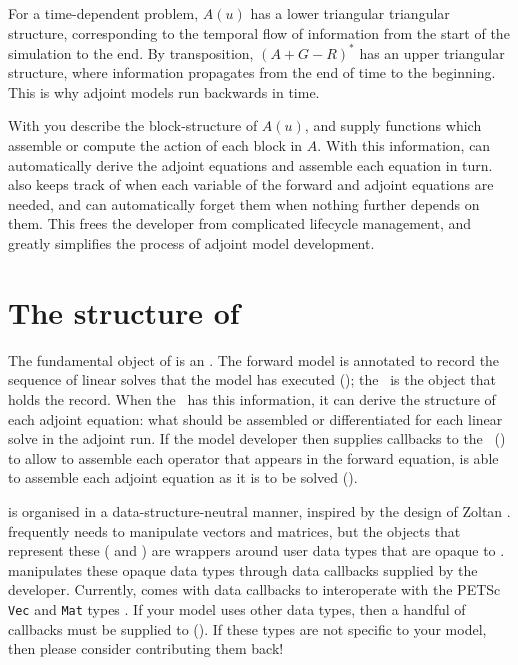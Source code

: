 For a time-dependent problem, $A(u)$ has a lower triangular triangular structure,
corresponding to the temporal flow of information from the start of the simulation
to the end. By transposition, $(A + G - R)^*$ has an upper triangular structure, where
information propagates from the end of time to the beginning. This is why adjoint
models run backwards in time.

With \libadjoint you describe the block-structure of $A(u)$,
and supply functions which assemble or compute the action of each block in $A$.
With this information, \libadjoint can automatically derive the adjoint equations
and assemble each equation in turn. \libadjoint also keeps track of when each
variable of the forward and adjoint equations are needed, and can automatically
forget them when nothing further depends on them. This frees the developer from
complicated lifecycle management, and greatly simplifies the process of adjoint model
development.

\section{The structure of \libadjoint}
The fundamental object of \libadjoint is an \adjointer. The forward model is annotated
to record the sequence of linear solves that the model has executed (); the \adjointer\ is
the object that holds the record. When the \adjointer\ has this information, it can derive
the structure of each adjoint equation: what should be assembled or differentiated for each linear
solve in the adjoint run. If the model developer then
supplies callbacks to the \adjointer\ () to allow \libadjoint to assemble each
operator that appears in the forward equation, \libadjoint is
able to assemble each adjoint equation as it is to be solved ().

\libadjoint is organised in a data-structure-neutral manner, inspired by the design
of Zoltan \citep{devine2002}. \libadjoint frequently needs to manipulate vectors
and matrices, but the objects that represent these ( and )
are wrappers around user data types that are opaque to \libadjoint. \libadjoint manipulates
these opaque data types through data callbacks supplied by the developer. Currently, \libadjoint
{}
comes with data callbacks to interoperate with the PETSc \texttt{Vec} and \texttt{Mat} types \citep{balay2010}.
If your model uses other data types, then a handful of callbacks must be supplied to \libadjoint ().
If these types are not specific to your model, then please consider contributing them back!

